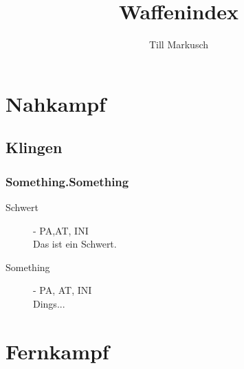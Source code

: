 \documentclass[a4paper,12pt,oneside]{book}
\title{Waffenindex}
\author{Till Markusch}
\date{}
\begin{document}
\maketitle
\tableofcontents

\chapter{Nahkampf}

\section{Klingen}

\subsection{Something.Something}

\begin{description}
\item[Schwert]- PA,AT, INI
\\Das ist ein Schwert.
\item[Something]- PA, AT, INI
\\Dings...
\end{description}

\chapter{Fernkampf}
\end{document}
